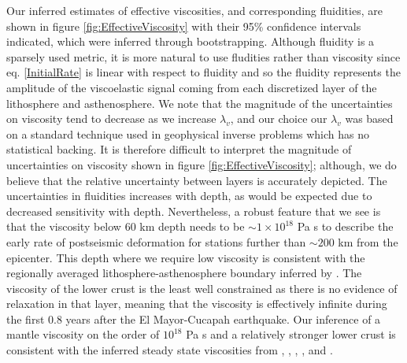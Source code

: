 \documentclass[1p]{elsarticle}
\begin{document}
Our inferred estimates of effective viscosities, and corresponding fluidities, are shown in figure \ref{fig:EffectiveViscosity} with their 95\% confidence intervals indicated, which were inferred through bootstrapping. Although fluidity is a sparsely used metric, it is more natural to use fludities rather than viscosity since eq. \ref{InitialRate} is linear with respect to fluidity and so the fluidity represents the amplitude of the viscoelastic signal coming from each discretized layer of the lithosphere and asthenosphere.  We note that the magnitude of the uncertainties on viscosity tend to decrease as we increase $\lambda_v$, and our choice our $\lambda_v$ was based on a standard technique used in geophysical inverse problems which has no statistical backing.  It is therefore difficult to interpret the magnitude of uncertainties on viscosity shown in figure \ref{fig:EffectiveViscosity}; although, we do believe that the relative uncertainty between layers is accurately depicted.  The uncertainties in fluidities increases with depth, as would be expected due to decreased sensitivity with depth.  Nevertheless, a robust feature that we see is that the viscosity below 60 km depth needs to be $\sim 1\times10^{18}$ Pa s to describe the early rate of postseismic deformation for stations further than $\sim200$ km from the epicenter.  This depth where we require low viscosity is consistent with the regionally averaged lithosphere-asthenosphere boundary inferred by \citet{Lekic2011}.  The viscosity of the lower crust is the least well constrained as there is no evidence of relaxation in that layer, meaning that the viscosity is effectively infinite during the first 0.8 years after the El Mayor-Cucapah earthquake. Our inference of a mantle viscosity on the order of $10^{18}$ Pa s and a relatively stronger lower crust is consistent with the inferred steady state viscosities from \citet{Pollitz2000}, \citet{Pollitz2003}, \citet{Johnson2007}, \citet{Spinler2015}, and \citet{Rollins2015}.  
\end{document}
